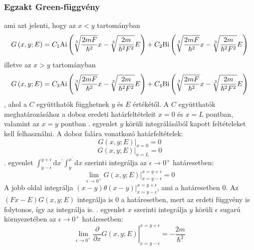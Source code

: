 \subsubsection{Egzakt Green-függvény}
ami azt jelenti, hogy az $x < y$ tartományban
\begin{equation}
    G\left(x, y; E\right) = C_1 \mathrm{Ai}\left(\sqrt[3]{\frac{2mF}{\hbar^2}}x - \sqrt[3]{\frac{2m}{\hbar^2F^2}}E\right) + C_2 \mathrm{Bi}\left(\sqrt[3]{\frac{2mF}{\hbar^2}}x - \sqrt[3]{\frac{2m}{\hbar^2F^2}}E\right)
    \label{green:xy}
\end{equation}
illetve az $x > y$ tartományban
\begin{equation}
    G\left(x, y; E\right) = C_3 \mathrm{Ai}\left(\sqrt[3]{\frac{2mF}{\hbar^2}}x - \sqrt[3]{\frac{2m}{\hbar^2F^2}}E\right) + C_4 \mathrm{Bi}\left(\sqrt[3]{\frac{2mF}{\hbar^2}}x - \sqrt[3]{\frac{2m}{\hbar^2F^2}}E\right)
    \label{green:yx}
\end{equation}
, ahol a $C$ együtthatók függhetnek $y$ és $E$ értékétől. A $C$ együtthatók meghatározásához a doboz eredeti határfeltételeit $x = 0$ és $x = L$ pontban, valamint az $x = y$ pontban . egyenlet $y$ körüli integrálásából kapott feltételeket kell felhasználni. A doboz falára vonatkozó határfeltételek:
\begin{equation}
	\left. G\left(x,y;E\right)\right\rvert_{x = 0} = 0
\end{equation}
\begin{equation}
	\left. G\left(x,y;E\right)\right\rvert_{x = L} = 0
\end{equation}
. egyenlet $\int_{y-\epsilon}^{y+\epsilon}\mathrm{d}x^\prime \int_{y}^{x^\prime} \mathrm{d}x$ szerinti integrálja az $\epsilon \to 0^+$ határesetben: 
\begin{equation}
	\lim_{\epsilon \to 0^+}\left.G\left(x,y;E \right)\right\rvert_{x = y - \epsilon}^{x = y + \epsilon} = 0
\end{equation}
A jobb oldal integrálja $\left. \left(x - y\right) \theta\left(x - y\right) \right\rvert_{x=y-\epsilon}^{x=y+\epsilon}$, ami a határesetben $0$. Az $\left(Fx - E\right)G\left(x,y;E\right)$ integrálja is $0$ a határesetben, mert az erdeti függvény is folytonos, így az integrálja is. . egyenlet $x$ szerinti integrálja $y$ körüli $\epsilon$ sugarú környezetében az $\epsilon \to 0^+$ határesetben:
\begin{equation}
	\lim_{\epsilon \to 0^+}\left.\frac{\partial}{\partial x}G\left(x,y;E \right)\right\rvert_{x = y - \epsilon}^{x = y + \epsilon} = -\frac{2m}{\hbar^2}
\end{equation}
